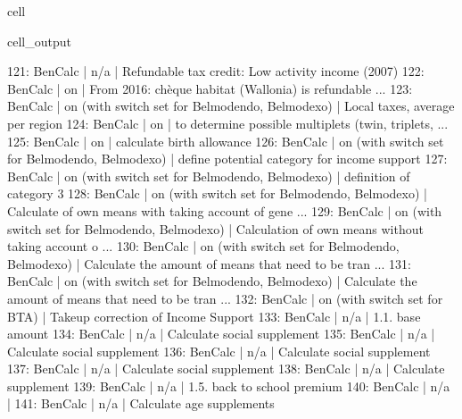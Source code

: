 \documentclass[letterpaper,10pt,english]{sphinxmanual}
\begin{document}
\begin{sphinxuseclass}{cell}
\begin{sphinxuseclass}{cell_output}
\begin{sphinxVerbatim}[commandchars=\\\{\}]
121: BenCalc     | n/a                                                      |    Refundable tax credit: Low activity income (2007) 
122: BenCalc     | on                                                       |    From 2016: chèque habitat (Wallonia) is refundable ... 
123: BenCalc     | on (with switch set for Belmod\PYGZus{}endo, Belmod\PYGZus{}exo)         |    Local taxes, average per region 
124: BenCalc     | on                                                       |    \PYGZdq{}to determine possible multiplets (twin, triplets, ... 
125: BenCalc     | on                                                       |    calculate birth allowance 
126: BenCalc     | on (with switch set for Belmod\PYGZus{}endo, Belmod\PYGZus{}exo)         |    define potential category for income support 
127: BenCalc     | on (with switch set for Belmod\PYGZus{}endo, Belmod\PYGZus{}exo)         |    definition of category 3 
128: BenCalc     | on (with switch set for Belmod\PYGZus{}endo, Belmod\PYGZus{}exo)         |    Calculate of own means with taking account of gene ... 
129: BenCalc     | on (with switch set for Belmod\PYGZus{}endo, Belmod\PYGZus{}exo)         |    Calculation of  own means without taking account o ... 
130: BenCalc     | on (with switch set for Belmod\PYGZus{}endo, Belmod\PYGZus{}exo)         |    Calculate the amount of means that need to be tran ... 
131: BenCalc     | on (with switch set for Belmod\PYGZus{}endo, Belmod\PYGZus{}exo)         |    Calculate the amount of means that need to be tran ... 
132: BenCalc     | on (with switch set for BTA)                             |    Take\PYGZhy{}up correction of Income Support 
133: BenCalc     | n/a                                                      |    1.1. base amount 
134: BenCalc     | n/a                                                      |    Calculate social supplement 
135: BenCalc     | n/a                                                      |    Calculate social supplement 
136: BenCalc     | n/a                                                      |    Calculate social supplement 
137: BenCalc     | n/a                                                      |    Calculate social supplement 
138: BenCalc     | n/a                                                      |    Calculate supplement 
139: BenCalc     | n/a                                                      |    1.5. back to school premium 
140: BenCalc     | n/a                                                      |     
141: BenCalc     | n/a                                                      |    Calculate age supplements 

\end{sphinxVerbatim}
\end{sphinxuseclass}
\end{sphinxuseclass}
\end{document}
